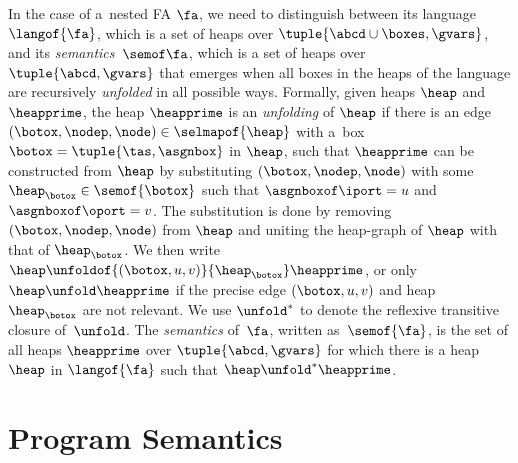 {In the case of a~nested FA $\fa$, we need to distinguish between its language
$\langof{\fa}$, which is a set of heaps over $\tuple{\abcd \cup \boxes,
\gvars}$, and its \emph{semantics}~$\semof \fa$, which is a set of heaps over
$\tuple{\abcd, \gvars}$ that emerges when all boxes in the heaps of the
language are recursively \emph{unfolded} in all possible ways.
Formally, given
heaps $\heap$ and~$\heapprime$, the heap $\heapprime$ is an \emph{unfolding} of $\heap$
 if there is an edge $(\botox, \nodep, \node) \in \selmapof{\heap}$
 with a~box $\botox = \tuple{\tas, \asgnbox}$ in $\heap$, 
such that $\heapprime$ can be constructed from $\heap$ by substituting
$(\botox, \nodep, \node)$ with some $\heap_{\botox} \in
\semof{\botox}$ such that $\asgnboxof \iport = u$ and $\asgnboxof \oport = v$. 
The substitution is done by removing 
$(\botox, \nodep, \node)$ from $\heap$ and uniting the heap-graph of $\heap$ with that of $\heap_{\botox}$. 
We then write $\heap \unfoldof{(\botox,u,v)}{\heap_{\botox}} \heapprime$, or only $\heap\unfold\heapprime$ if the
precise edge $(\botox, u, v)$ and heap~$\heap_{\botox}$
are not relevant.
We use $\unfold^{*}$ to denote the reflexive transitive
closure of~$\unfold$.
The \emph{semantics} of~$\fa$, written as~$\semof{\fa}$,
is the set of all heaps $\heapprime$ over $\tuple{\abcd, \gvars}$ for which
there is a heap $\heap$ in $\langof{\fa}$ such that $\heap \unfold^{*}
\heapprime$.



\section{Program Semantics}

}
